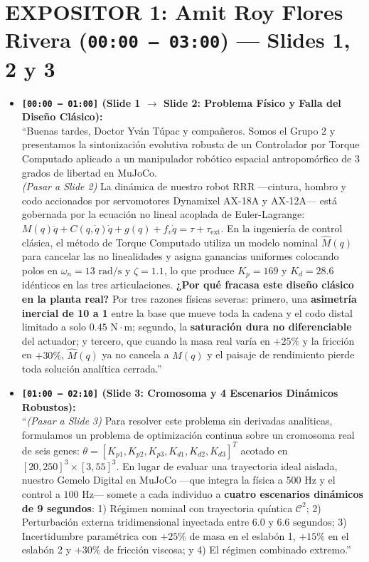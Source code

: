 \documentclass[11pt,a4paper]{article}
\begin{document}
\section*{EXPOSITOR 1: Amit Roy Flores Rivera (\texttt{00:00 -- 03:00}) — Slides 1, 2 y 3}
\begin{itemize}
    \item \textbf{\texttt{[00:00 -- 01:00]} (Slide 1 $\to$ Slide 2: Problema Físico y Falla del Diseño Clásico):} \\
    ``Buenas tardes, Doctor Yván Túpac y compañeros. Somos el Grupo 2 y presentamos la sintonización evolutiva robusta de un Controlador por Torque Computado aplicado a un manipulador robótico espacial antropomórfico de 3 grados de libertad en MuJoCo. \\
    \textit{(Pasar a Slide 2)} La dinámica de nuestro robot RRR —cintura, hombro y codo accionados por servomotores Dynamixel AX-18A y AX-12A— está gobernada por la ecuación no lineal acoplada de Euler-Lagrange: $M(q)\ddot{q} + C(q,\dot{q})\dot{q} + g(q) + f_v\dot{q} = \tau + \tau_{\text{ext}}$. En la ingeniería de control clásica, el método de Torque Computado utiliza un modelo nominal $\hat{M}(q)$ para cancelar las no linealidades y asigna ganancias uniformes colocando polos en $\omega_n = 13\text{ rad/s}$ y $\zeta = 1.1$, lo que produce $K_p = 169$ y $K_d = 28.6$ idénticos en las tres articulaciones. \textbf{¿Por qué fracasa este diseño clásico en la planta real?} Por tres razones físicas severas: primero, una \textbf{asimetría inercial de 10 a 1} entre la base que mueve toda la cadena y el codo distal limitado a solo $0.45\text{ N}\cdot\text{m}$; segundo, la \textbf{saturación dura no diferenciable} del actuador; y tercero, que cuando la masa real varía en $+25\%$ y la fricción en $+30\%$, $\hat{M}(q)$ ya no cancela a $M(q)$ y el paisaje de rendimiento pierde toda solución analítica cerrada.''

    \item \textbf{\texttt{[01:00 -- 02:10]} (Slide 3: Cromosoma y 4 Escenarios Dinámicos Robustos):} \\
    ``\textit{(Pasar a Slide 3)} Para resolver este problema sin derivadas analíticas, formulamos un problema de optimización continua sobre un cromosoma real de seis genes: $\theta = [K_{p1}, K_{p2}, K_{p3}, K_{d1}, K_{d2}, K_{d3}]^T$ acotado en $[20, 250]^3 \times [3, 55]^3$. En lugar de evaluar una trayectoria ideal aislada, nuestro Gemelo Digital en MuJoCo —que integra la física a $500\text{ Hz}$ y el control a $100\text{ Hz}$— somete a cada individuo a \textbf{cuatro escenarios dinámicos de 9 segundos}: 1) Régimen nominal con trayectoria quíntica $\mathcal{C}^2$; 2) Perturbación externa tridimensional inyectada entre $6.0$ y $6.6\text{ segundos}$; 3) Incertidumbre paramétrica con $+25\%$ de masa en el eslabón 1, $+15\%$ en el eslabón 2 y $+30\%$ de fricción viscosa; y 4) El régimen combinado extremo.''


\end{itemize}
\end{document}

